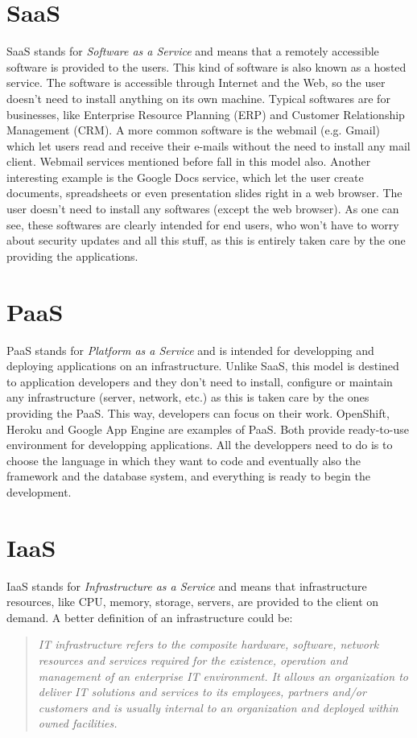 \section{SaaS}
SaaS stands for \textit{Software as a Service} and means that a remotely accessible software is provided to the users. 
This kind of software is also known as a hosted service. 
The software is accessible through Internet and the Web, so the user doesn't need to install anything on its own machine. 
Typical softwares are for businesses, like Enterprise Resource Planning (ERP) and Customer Relationship Management (CRM). 
A more common software is the webmail (e.g. Gmail) which let users read and receive their e-mails without the need to install any mail client. 
Webmail services mentioned before fall in this model also. 
Another interesting example is the Google Docs service, which let the user create documents, spreadsheets or even presentation slides right in a web browser. 
The user doesn't need to install any softwares (except the web browser). 
As one can see, these softwares are clearly intended for end users, who won't have to worry about security updates and all this stuff, as this is entirely taken care by the one providing the applications.





\section{PaaS}
PaaS stands for \textit{Platform as a Service} and is intended for developping and deploying applications on an infrastructure. 
Unlike SaaS, this model is destined to application developers and they don't need to install, configure or maintain any infrastructure (server, network, etc.) as this is taken care by the ones providing the PaaS. 
This way, developers can focus on their work. 
OpenShift, Heroku and Google App Engine are examples of PaaS.
Both provide ready-to-use environment for developping applications.
All the developpers need to do is to choose the language in which they want to code and eventually also the framework and the database system, and everything is ready to begin the development.





\section{IaaS}
IaaS stands for \textit{Infrastructure as a Service} and means that infrastructure resources, like CPU, memory, storage, servers, are provided to the client on demand. A better definition of an infrastructure could be:
\begin{quotation}
\textit{
IT infrastructure refers to the composite hardware, software, network resources and services required for the existence, operation and management of an enterprise IT environment. It allows an organization to deliver IT solutions and services to its employees, partners and/or customers and is usually internal to an organization and deployed within owned facilities.
}\cite{cjanssen14}
\end{quotation}

